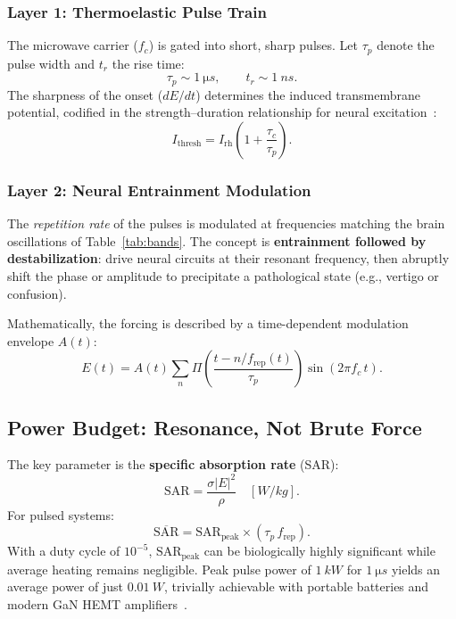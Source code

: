 \documentclass[aps,prl,twocolumn,superscriptaddress,showpacs]{revtex4-2}
\begin{document}
\subsubsection{Layer 1: Thermoelastic Pulse Train}
The microwave carrier ($f_c$) is gated into short, sharp pulses. Let $\tau_p$ denote the pulse width and $t_r$ the rise time:
\begin{equation}
\tau_p \sim \SI{1}{\micro s}, \qquad t_r \sim \SI{1}{ns}.
\label{eq:pulse_params}
\end{equation}
The sharpness of the onset ($dE/dt$) determines the induced transmembrane potential, codified in the strength--duration relationship for neural excitation~\cite{Reilly1998}:
\begin{equation}
I_{\text{thresh}} = I_{\text{rh}} \left(1 + \frac{\tau_c}{\tau_p}\right).
\label{eq:strength_duration}
\end{equation}

\subsubsection{Layer 2: Neural Entrainment Modulation}
The \emph{repetition rate} of the pulses is modulated at frequencies matching the brain oscillations of Table~\ref{tab:bands}. The concept is \textbf{entrainment followed by destabilization}: drive neural circuits at their resonant frequency, then abruptly shift the phase or amplitude to precipitate a pathological state (e.g., vertigo or confusion).

Mathematically, the forcing is described by a time-dependent modulation envelope $A(t)$:
\begin{equation}
E(t) = A(t) \sum_{n} \Pi\!\left(\frac{t - n/f_{\text{rep}}(t)}
{\tau_p}\right) \sin(2\pi f_c\, t).
\label{eq:waveform}
\end{equation}

\subsection{Power Budget: Resonance, Not Brute Force}

The key parameter is the \textbf{specific absorption rate} (SAR):
\begin{equation}
\text{SAR} = \frac{\sigma |E|^2}{\rho} \quad [\si{W/kg}].
\label{eq:SAR}
\end{equation}
For pulsed systems:
\begin{equation}
\overline{\text{SAR}} = \text{SAR}_{\text{peak}} \times (\tau_p \, f_{\text{rep}}).
\label{eq:avg_SAR}
\end{equation}
With a duty cycle of $10^{-5}$, $\text{SAR}_{\text{peak}}$ can be biologically highly significant while average heating remains negligible. Peak pulse power of $\SI{1}{kW}$ for $\SI{1}{\micro s}$ yields an average power of just $\SI{0.01}{W}$, trivially achievable with portable batteries and modern GaN HEMT amplifiers~\cite{Mishra2008}.
\end{document}
